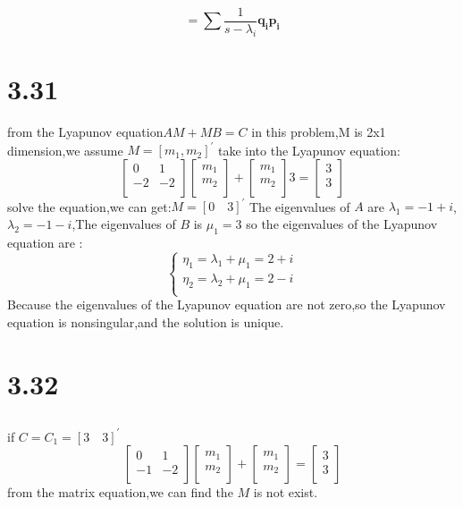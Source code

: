 \documentclass{article}
\newcommand{\rmnum}[1]{\romannumeral #1}
\begin{document}
\[=\sum \frac{1}{s-\lambda_i} \boldsymbol{q_ip_i}\]

\section*{3.31}
from the Lyapunov equation$AM+MB=C$
in this problem,M is 2x1 dimension,we assume $M=[m_1,m_2]^{'}$
take into the Lyapunov equation:
\[
\left[
\begin{array}{cc}
0 & 1\\
-2 & -2\\
\end{array}
\right]
\left[
\begin{array}{c}
m_1\\
m_2\\
\end{array}
\right]+
\left[
\begin{array}{c}
m_1\\
m_2\\
\end{array}
\right]
3=
\left[
\begin{array}{c}
3\\
3\\
\end{array}  
\right]  
\]
solve the equation,we can get:$M=[0 \quad 3]^{'}$
The eigenvalues of $A$ are $\lambda_1=-1+i$,$\lambda_2=-1-i$,The eigenvalues of $B$
is $\mu_1=3$
so the eigenvalues of the Lyapunov equation are :
\[
\left\{
\begin{array}{ll}
\eta_1=\lambda_1+\mu_1=2+i\\
\eta_2=\lambda_2+\mu_1=2-i\\    
\end{array}
\right.
\]
Because the eigenvalues of the Lyapunov equation are not zero,so the Lyapunov equation is nonsingular,and the solution is unique.

\section*{3.32}
\subsection*{\rmnum{1}}
if $C=C_1=[3 \quad 3]^{'}$
\[
\left[
\begin{array}{cc}
0 & 1\\
-1 & -2\\
\end{array}
\right]
\left[
\begin{array}{c}
m_1\\
m_2\\
\end{array}
\right]+
\left[
\begin{array}{c}
m_1\\
m_2\\
\end{array}
\right]
=
\left[
\begin{array}{c}
3\\
3\\
\end{array}  
\right]  
\]
from the matrix equation,we can find the $M$ is not exist.
\end{document}
